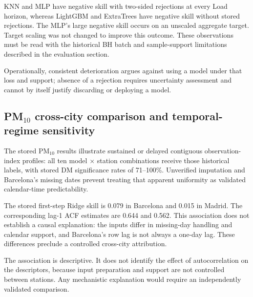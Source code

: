 \documentclass[pdflatex,sn-mathphys]{sn-jnl}
\begin{document}
KNN and MLP have negative skill with two-sided rejections at every Load
horizon, whereas LightGBM and ExtraTrees have negative skill without stored
rejections. The MLP's large negative skill occurs on an unscaled aggregate
target. Target scaling was not changed to improve this outcome. These
observations must be read with the historical BH batch and sample-support
limitations described in the evaluation section.

Operationally, consistent deterioration argues against using a model under
that loss and support; absence of a rejection requires uncertainty assessment
and cannot by itself justify discarding or deploying a model.

\subsection{PM$_{10}$ cross-city comparison and temporal-regime sensitivity}\label{sec:pm10-discuss}

The stored PM$_{10}$ results illustrate sustained or delayed contiguous observation-index profiles: all ten model $\times$ station combinations receive those historical labels, with stored DM significance rates of 71--100\%. Unverified imputation and Barcelona's missing dates prevent treating that apparent uniformity as validated calendar-time predictability.

The stored first-step Ridge skill is 0.079 in Barcelona and 0.015 in Madrid.
The corresponding lag-1 ACF estimates are 0.644 and 0.562. This association
does not establish a causal explanation: the inputs differ in missing-day
handling and calendar support, and Barcelona's row lag is not always a
one-day lag. These differences preclude a controlled cross-city attribution.

The association is descriptive. It does not identify the effect of autocorrelation on the descriptors, because input preparation and support are not controlled between stations. Any mechanistic explanation would require an independently validated comparison.

\end{document}
